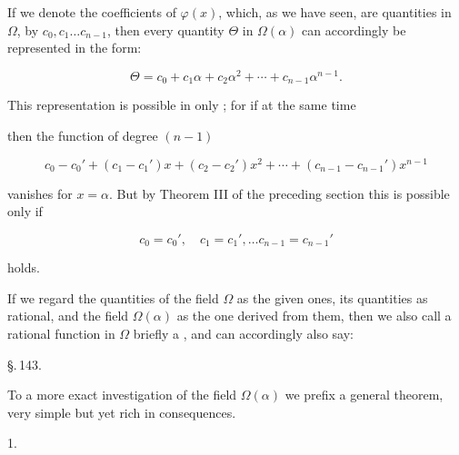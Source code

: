 If we denote the coefficients of $\varphi(x)$, which, as we have seen, are quantities in $\Omega$, by $c_0, c_1 \ldots c_{n-1}$, then every quantity $\Theta$ in $\Omega(\alpha)$ can accordingly be represented in the form:

\[
\Theta = c_0 + c_1\alpha + c_2\alpha^2 + \cdots + c_{n-1}\alpha^{n-1}.
\]

This representation is possible in only ; for if at the same time


then the function of degree $(n-1)$

\[
c_0 - c_0' + (c_1 - c_1')x + (c_2 - c_2')x^2 + \cdots + (c_{n-1} - c_{n-1}')x^{n-1}
\]

vanishes for $x = \alpha$. But by Theorem III of the preceding section this is possible only if

\[
c_0 = c_0', \quad c_1 = c_1', \ldots c_{n-1} = c_{n-1}'
\]

holds.

If we regard the quantities of the field $\Omega$ as the given ones, its quantities as rational, and the field $\Omega(\alpha)$ as the one derived from them, then we also call a rational function in $\Omega$ briefly a , and can accordingly also say:


\begin{center}
\S.\,143.

\end{center}

To a more exact investigation of the field $\Omega(\alpha)$ we prefix a general theorem, very simple but yet rich in consequences.

1. 
